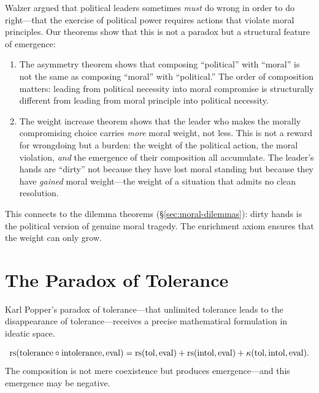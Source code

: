 \begin{interpretation}
Walzer argued that political leaders sometimes \emph{must} do wrong in
order to do right---that the exercise of political power requires actions
that violate moral principles. Our theorems show that this is not a
paradox but a structural feature of emergence:

\begin{enumerate}
\item The asymmetry theorem shows that composing ``political'' with
``moral'' is not the same as composing ``moral'' with ``political.''
The order of composition matters: leading from political necessity into
moral compromise is structurally different from leading from moral
principle into political necessity.

\item The weight increase theorem shows that the leader who makes the
morally compromising choice carries \emph{more} moral weight, not less.
This is not a reward for wrongdoing but a burden: the weight of the
political action, the moral violation, \emph{and} the emergence of
their composition all accumulate. The leader's hands are ``dirty'' not
because they have lost moral standing but because they have \emph{gained}
moral weight---the weight of a situation that admits no clean resolution.
\end{enumerate}

This connects to the dilemma theorems (\S\ref{sec:moral-dilemmas}):
dirty hands is the political version of genuine moral tragedy. The
enrichment axiom ensures that the weight can only grow.
\end{interpretation}

\section{The Paradox of Tolerance}
\label{sec:tolerance-paradox}

Karl Popper's paradox of tolerance---that unlimited tolerance leads to
the disappearance of tolerance---receives a precise mathematical
formulation in ideatic space.

\begin{theorem}
\label{thm:tolerance-emergence}
\[
  \mathrm{rs}(\mathrm{tolerance} \circ \mathrm{intolerance}, \mathrm{eval})
  = \mathrm{rs}(\mathrm{tol}, \mathrm{eval}) + \mathrm{rs}(\mathrm{intol}, \mathrm{eval})
  + \kappa(\mathrm{tol}, \mathrm{intol}, \mathrm{eval}).
\]
The composition is not mere coexistence but produces emergence---and
this emergence may be negative.
\end{theorem}

